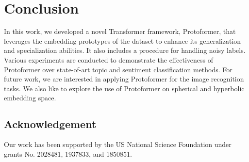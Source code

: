 \documentclass[letterpaper]{article} \usepackage{aaai22}  \usepackage{times}  \usepackage{helvet}  \usepackage{courier}  \usepackage{amsmath,amssymb}
\begin{document}
 

\section{Conclusion}
\label{section-conclusion}
In this work, we developed a novel Transformer framework, Protoformer, that leverages the embedding prototypes of the dataset to enhance its generalization and specialization abilities.
It also includes a procedure for handling noisy labels. Various experiments are conducted to demonstrate the effectiveness of Protoformer over state-of-art topic and sentiment classification methods. 
For future work, we are interested in applying Protoformer for the image recognition tasks. We also like to explore the use of Protoformer on spherical and hyperbolic embedding space.

\vspace{-2mm}

\vspace{-2mm}
\subsection*{Acknowledgement}
Our work has been supported by the US National Science Foundation under grants No. 2028481, 1937833, and 1850851.
 


\end{document}
